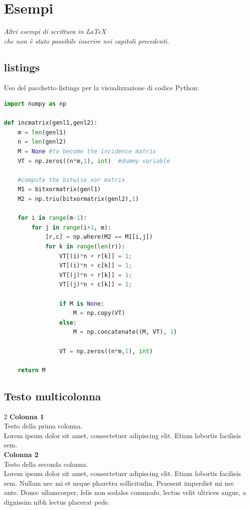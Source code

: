 \chapter{Esempi}  \label{Cap.3}

\vspace{2cm}

\begin{flushright}
 \textit{Altri esempi di scrittura in \LaTeX\\ che non è stato possibile inserire nei capitoli precedenti.}
\end{flushright}

\vspace{0.5cm}

\section{listings}
Uso del pacchetto {\ttfamily listings} per la visualizzazione di codice Python:
\begin{lstlisting}[language=Python]
import numpy as np

def incmatrix(genl1,genl2):
    m = len(genl1)
    n = len(genl2)
    M = None #to become the incidence matrix
    VT = np.zeros((n*m,1), int)  #dummy variable

    #compute the bitwise xor matrix
    M1 = bitxormatrix(genl1)
    M2 = np.triu(bitxormatrix(genl2),1)

    for i in range(m-1):
        for j in range(i+1, m):
            [r,c] = np.where(M2 == M1[i,j])
            for k in range(len(r)):
                VT[(i)*n + r[k]] = 1;
                VT[(i)*n + c[k]] = 1;
                VT[(j)*n + r[k]] = 1;
                VT[(j)*n + c[k]] = 1;

                if M is None:
                    M = np.copy(VT)
                else:
                    M = np.concatenate((M, VT), 1)

                VT = np.zeros((n*m,1), int)

    return M
\end{lstlisting}


\section{Testo multicolonna}

\begin{multicols}{2}
    \textbf{Colonna 1}\\
    Testo della prima colonna.\\
    Lorem ipsum dolor sit amet, consectetuer adipiscing elit. Etiam lobortis facilisis sem.
    \columnbreak\\
    \textbf{Colonna 2}\\
    Testo della seconda colonna.\\
    Lorem ipsum dolor sit amet, consectetuer adipiscing elit. Etiam lobortis facilisis sem. Nullam nec mi et neque pharetra sollicitudin. Praesent imperdiet mi nec ante. Donec ullamcorper, felis non sodales commodo, lectus velit ultrices augue, a dignissim nibh lectus placerat pede.
\end{multicols}

